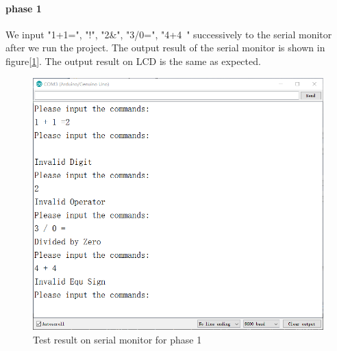 \paragraph{phase 1}
We input "1+1=", "!", "2\&", "3/0=", "4+4~" successively to the serial monitor after we run the project. The output result of the serial monitor is shown in figure[\ref{fig:test1}]. The output result on LCD is the same as expected.
\begin{figure}[!htbp]
	\centering
	\includegraphics[width = \linewidth]{images/test1.png}
	\caption{Test result on serial monitor for phase 1}
	\label{fig:test1}
\end{figure}

